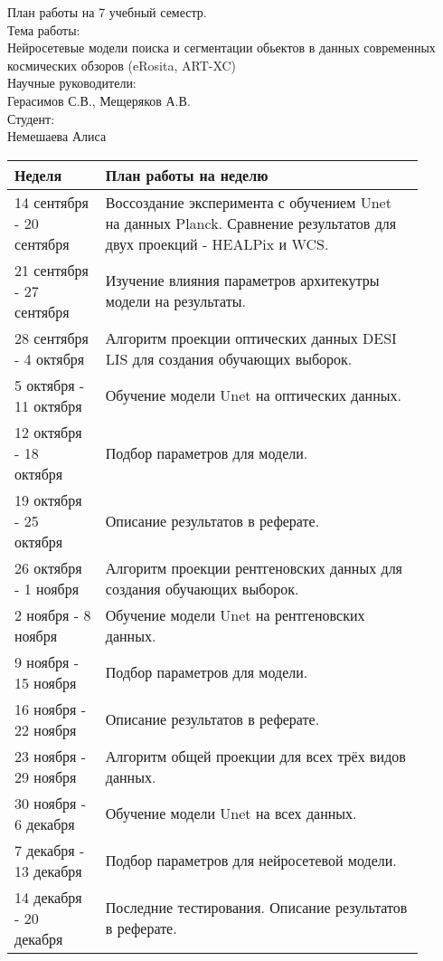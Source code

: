 \documentclass{article}
\begin{document}
План работы на 7 учебный семестр.\\
Тема работы:\\
Нейросетевые модели поиска и сегментации обьектов в данных современных космических обзоров (eRosita, ART-XC)\\
Научные руководители:\\
Герасимов С.В., Мещеряков А.В.\\
Студент:\\
Немешаева Алиса\\
    \begin{table}[h!]
        \begin{tabular}{|p{0.2\linewidth}|p{0.7\linewidth}|}
            \hline
            \textbf{Неделя} & \textbf{План работы на неделю}\\
            \hline
            14 сентября - 20 сентября & Воссоздание эксперимента с обучением Unet на данных 
                Planck. Сравнение результатов для двух проекций - HEALPix и WCS.\\ 
            21 сентября - 27 сентября & Изучение влияния параметров архитекутры модели на результаты.\\
            28 сентября - 4 октября & Алгоритм проекции оптических данных DESI LIS для создания 
                обучающих выборок.\\
            5 октября - 11 октября & Обучение модели Unet на оптических данных. \\
            12 октября - 18 октября & Подбор параметров для модели.\\
            19 октября - 25 октября & Описание результатов в реферате.\\
            26 октября - 1 ноября & Алгоритм проекции рентгеновских данных для создания обучающих 
                выборок.\\
            2 ноября - 8 ноября & Обучение модели Unet на рентгеновских данных.\\
            9 ноября - 15 ноября & Подбор параметров для модели.\\
            16 ноября - 22 ноября & Описание результатов в реферате.\\
            23 ноября - 29 ноября & Алгоритм общей проекции для всех трёх видов данных.\\
            30 ноября - 6 декабря & Обучение модели Unet на всех данных.\\
            7 декабря - 13 декабря & Подбор параметров для нейросетевой модели.\\
            14 декабря - 20 декабря & Последние тестирования. Описание результатов в реферате.\\
            \hline
        \end{tabular}
    \end{table}
\end{document}
